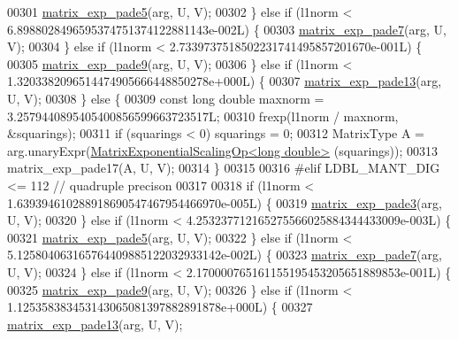 \begin{DoxyCode}
00301       \hyperlink{namespace_eigen_1_1internal_af4992d182490219270a24aaa8285e63a}{matrix\_exp\_pade5}(arg, U, V);
00302     \} \textcolor{keywordflow}{else} \textcolor{keywordflow}{if} (l1norm < 6.8988028496595374751374122881143e-002L) \{
00303       \hyperlink{namespace_eigen_1_1internal_a1abecb439e6cb1b5188828cdb7e0ab60}{matrix\_exp\_pade7}(arg, U, V);
00304     \} \textcolor{keywordflow}{else} \textcolor{keywordflow}{if} (l1norm < 2.7339737518502231741495857201670e-001L) \{
00305       \hyperlink{namespace_eigen_1_1internal_a218447e97bf869bf354f92e020a7355a}{matrix\_exp\_pade9}(arg, U, V);
00306     \} \textcolor{keywordflow}{else} \textcolor{keywordflow}{if} (l1norm < 1.3203382096514474905666448850278e+000L) \{
00307       \hyperlink{namespace_eigen_1_1internal_ae7d0962a143c96343984440db683905a}{matrix\_exp\_pade13}(arg, U, V);
00308     \} \textcolor{keywordflow}{else} \{
00309       \textcolor{keyword}{const} \textcolor{keywordtype}{long} \textcolor{keywordtype}{double} maxnorm = 3.2579440895405400856599663723517L;
00310       frexp(l1norm / maxnorm, &squarings);
00311       \textcolor{keywordflow}{if} (squarings < 0) squarings = 0;
00312       MatrixType A = arg.unaryExpr(\hyperlink{struct_eigen_1_1internal_1_1_matrix_exponential_scaling_op}{MatrixExponentialScalingOp<long double>}
      (squarings));
00313       matrix\_exp\_pade17(A, U, V);
00314     \}
00315   
00316 \textcolor{preprocessor}{#elif LDBL\_MANT\_DIG <= 112  // quadruple precison}
00317   
00318     \textcolor{keywordflow}{if} (l1norm < 1.639394610288918690547467954466970e-005L) \{
00319       \hyperlink{namespace_eigen_1_1internal_a7e6cf2e01b6fb376d33b9bb8183e5777}{matrix\_exp\_pade3}(arg, U, V);
00320     \} \textcolor{keywordflow}{else} \textcolor{keywordflow}{if} (l1norm < 4.253237712165275566025884344433009e-003L) \{
00321       \hyperlink{namespace_eigen_1_1internal_af4992d182490219270a24aaa8285e63a}{matrix\_exp\_pade5}(arg, U, V);
00322     \} \textcolor{keywordflow}{else} \textcolor{keywordflow}{if} (l1norm < 5.125804063165764409885122032933142e-002L) \{
00323       \hyperlink{namespace_eigen_1_1internal_a1abecb439e6cb1b5188828cdb7e0ab60}{matrix\_exp\_pade7}(arg, U, V);
00324     \} \textcolor{keywordflow}{else} \textcolor{keywordflow}{if} (l1norm < 2.170000765161155195453205651889853e-001L) \{
00325       \hyperlink{namespace_eigen_1_1internal_a218447e97bf869bf354f92e020a7355a}{matrix\_exp\_pade9}(arg, U, V);
00326     \} \textcolor{keywordflow}{else} \textcolor{keywordflow}{if} (l1norm < 1.125358383453143065081397882891878e+000L) \{
00327       \hyperlink{namespace_eigen_1_1internal_ae7d0962a143c96343984440db683905a}{matrix\_exp\_pade13}(arg, U, V);

\end{DoxyCode}
